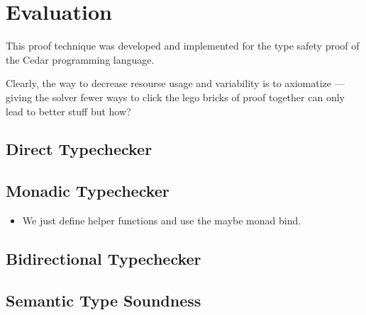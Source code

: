 \documentclass[sigplan,review,screen,anonymous]{acmart}
\begin{document}




\section{Evaluation}

\label{sec:eval}



This proof technique was developed and implemented for the type safety proof of the Cedar programming language.

Clearly, the way to decrease resourse usage and variability is to axiomatize --- giving the solver fewer ways to click the lego bricks
of proof together can only lead to better stuff but how?

\subsection*{Direct Typechecker}

\subsection*{Monadic Typechecker}

\begin{itemize}
  \item We just define helper functions and use the maybe monad bind.
\end{itemize}

\subsection*{Bidirectional Typechecker}

\subsection*{Semantic Type Soundness}







\end{document}
